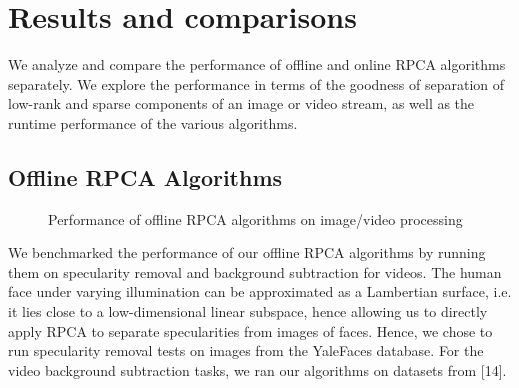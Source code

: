 \documentclass[oneside]{article}
\begin{document}
\section{Results and comparisons}
We analyze and compare the performance of offline and online RPCA algorithms separately. We explore the performance in terms of the goodness of separation of low-rank and sparse components of an image or video stream, as well as the runtime performance of the various algorithms.
\subsection{Offline RPCA Algorithms}
\begin{figure}[ht]   
\centering
{}
\caption[]{Performance of offline RPCA algorithms on image/video processing}
\label{fig:subfigureExample1}
\end{figure}
We benchmarked the performance of our offline RPCA algorithms by running them on specularity removal and background subtraction for videos. The human face under varying illumination can be approximated as a Lambertian surface, i.e. it lies close to a low-dimensional linear subspace, hence allowing us to directly apply RPCA to separate specularities from images of faces. Hence, we chose to run specularity removal tests on images from the YaleFaces database. For the video background subtraction tasks, we ran our algorithms on datasets from [14].\newline\newline
\end{document}
